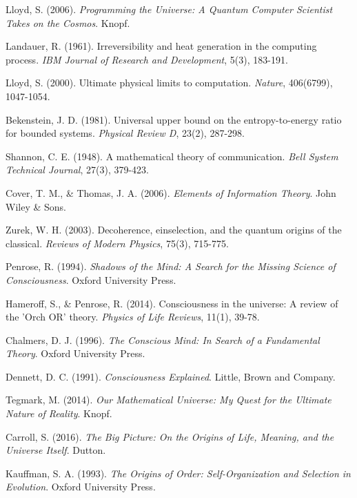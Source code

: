 \documentclass[11pt,a4paper]{article}
\theoremstyle{remark}
\begin{document}
{{{{{{{{{{\begin{thebibliography}{99}
Lloyd, S. (2006). \textit{Programming the Universe: A Quantum Computer Scientist Takes on the Cosmos}. Knopf.

Landauer, R. (1961). Irreversibility and heat generation in the computing process. \textit{IBM Journal of Research and Development}, 5(3), 183-191.

Lloyd, S. (2000). Ultimate physical limits to computation. \textit{Nature}, 406(6799), 1047-1054.

Bekenstein, J. D. (1981). Universal upper bound on the entropy-to-energy ratio for bounded systems. \textit{Physical Review D}, 23(2), 287-298.

Shannon, C. E. (1948). A mathematical theory of communication. \textit{Bell System Technical Journal}, 27(3), 379-423.

Cover, T. M., \& Thomas, J. A. (2006). \textit{Elements of Information Theory}. John Wiley \& Sons.

Zurek, W. H. (2003). Decoherence, einselection, and the quantum origins of the classical. \textit{Reviews of Modern Physics}, 75(3), 715-775.

Penrose, R. (1994). \textit{Shadows of the Mind: A Search for the Missing Science of Consciousness}. Oxford University Press.

Hameroff, S., \& Penrose, R. (2014). Consciousness in the universe: A review of the 'Orch OR' theory. \textit{Physics of Life Reviews}, 11(1), 39-78.

Chalmers, D. J. (1996). \textit{The Conscious Mind: In Search of a Fundamental Theory}. Oxford University Press.

Dennett, D. C. (1991). \textit{Consciousness Explained}. Little, Brown and Company.

Tegmark, M. (2014). \textit{Our Mathematical Universe: My Quest for the Ultimate Nature of Reality}. Knopf.

Carroll, S. (2016). \textit{The Big Picture: On the Origins of Life, Meaning, and the Universe Itself}. Dutton.

Kauffman, S. A. (1993). \textit{The Origins of Order: Self-Organization and Selection in Evolution}. Oxford University Press.


\end{thebibliography}}}}}}}}}}}
\end{document}
